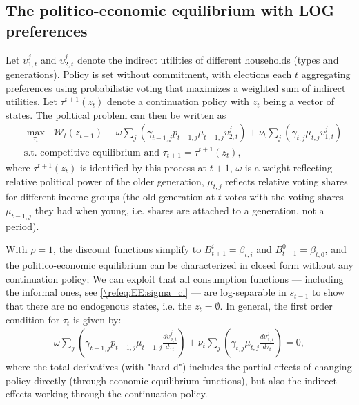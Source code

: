 \documentclass[a4paper]{article}
\begin{document}
\subsection{The politico-economic equilibrium with LOG preferences}\label{\refsec:PEELOG}
Let $\upsilon_{1,t}^j$ and $\upsilon_{2,t}^j$ denote the indirect utilities of different households (types and generations). Policy is set without commitment, with elections each $t$ aggregating preferences using probabilistic voting that maximizes a weighted sum of indirect utilities. Let $\tau^{t+1}(z_t)$ denote a continuation policy with $z_t$ being a vector of states. The political problem can then be written as
\begin{align*}
    &\max_{\tau_t}\mbox{ }\mathcal{W}_t(z_{t-1}) \equiv \omega\sum_j\left(\gamma_{t-1,j} p_{t-1,j} \mu_{t-1,j} v_{2,t}^j\right)+\nu_t\sum_j\left(\gamma_{t,j}\mu_{t,j} v_{1,t}^j\right) \\
    &\text{s.t. competitive equilibrium and }\tau_{t+1} = \tau^{t+1}(z_t),
\end{align*}
where $\tau^{t+1}(z_t)$ is identified by this process at $t+1$, $\omega$ is a weight reflecting relative political power of the older generation, $\mu_{t,j}$ reflects relative voting shares for different income groups (the old generation at $t$ votes with the voting shares $\mu_{t-1,j}$ they had when young, i.e. shares are attached to a generation, not a period).

With $\rho = 1$, the discount functions simplify to $B_{t+1}^i = \beta_{t,i}$ and $B_{t+1}^0 = \beta_{t,0}$, and the politico-economic equilibrium can be characterized in closed form without any continuation policy; We can exploit that all consumption functions --- including the informal ones, see \eqref{\refeq:EE:sigma_ci} --- are log-separable in $s_{t-1}$ to show that there are no endogenous states, i.e. the $z_t = \emptyset$. In general, the first order condition for $\tau_t$ is given by:
\begin{align*}
    \omega\sum_{j}\left(\gamma_{t-1,j}p_{t-1,j}\mu_{t-1,j} \frac{d\upsilon_{2,t}^j}{d\tau_t}\right)+
    \nu_t\sum_j\left(\gamma_{t,j}\mu_{t,j} \frac{d\upsilon_{1,t}^j}{d\tau_t}\right) = 0,
\end{align*}
where the total derivatives (with "hard d") includes the partial effects of changing policy directly (through economic equilibrium functions), but also the indirect effects working through the continuation policy.
\end{document}
